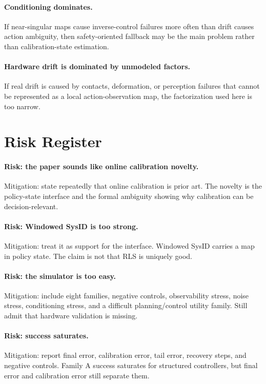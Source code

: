\documentclass{article}
\begin{document}
\paragraph{Conditioning dominates.}
If near-singular maps cause inverse-control failures more often than drift
causes action ambiguity, then safety-oriented fallback may be the main problem
rather than calibration-state estimation.

\paragraph{Hardware drift is dominated by unmodeled factors.}
If real drift is caused by contacts, deformation, or perception failures that
cannot be represented as a local action-observation map, the factorization used
here is too narrow.

\section{Risk Register}

\paragraph{Risk: the paper sounds like online calibration novelty.}
Mitigation: state repeatedly that online calibration is prior art. The novelty
is the policy-state interface and the formal ambiguity showing why calibration
can be decision-relevant.

\paragraph{Risk: Windowed SysID is too strong.}
Mitigation: treat it as support for the interface. Windowed SysID carries a
map in policy state. The claim is not that RLS is uniquely good.

\paragraph{Risk: the simulator is too easy.}
Mitigation: include eight families, negative controls, observability stress,
noise stress, conditioning stress, and a difficult planning/control utility
family. Still admit that hardware validation is missing.

\paragraph{Risk: success saturates.}
Mitigation: report final error, calibration error, tail error, recovery steps,
and negative controls. Family A success saturates for structured controllers,
but final error and calibration error still separate them.
\end{document}
